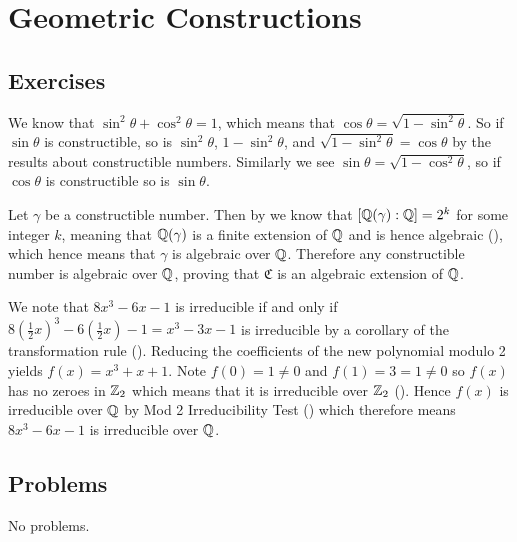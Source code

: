 \section{Geometric Constructions}
\subsection*{Exercises}
\begin{questions}
    \item We know that $\sin^2\theta + \cos^2\theta = 1$, which means that $\cos\theta = \sqrt{1-\sin^2\theta}$. So if $\sin\theta$ is constructible, so is $\sin^2\theta$, $1 - \sin^2\theta$, and $\sqrt{1-\sin^2\theta} = \cos\theta$ by the results about constructible numbers. Similarly we see $\sin\theta = \sqrt{1-\cos^2\theta}$, so if $\cos\theta$ is constructible so is $\sin\theta$.

    \item Let $\gamma$ be a constructible number. Then by  we know that $[\mathbb{Q}(\gamma):\mathbb{Q}] = 2^k$ for some integer $k$, meaning that $\mathbb{Q}(\gamma)$ is a finite extension of $\mathbb{Q}$ and is hence algebraic (), which hence means that $\gamma$ is algebraic over $\mathbb{Q}$. Therefore any constructible number is algebraic over $\mathbb{Q}$, proving that $\mathfrak{C}$ is an algebraic extension of $\mathbb{Q}$.

    \item We note that $8x^3 - 6x - 1$ is irreducible if and only if $8\left(\frac12x\right)^3 - 6\left(\frac12x\right) - 1 = x^3 - 3x - 1$ is irreducible by a corollary of the transformation rule (). Reducing the coefficients of the new polynomial modulo 2 yields $f(x) = x^3 + x + 1$. Note $f(0) = 1 \neq 0$ and $f(1) = 3 = 1 \neq 0$ so $f(x)$ has no zeroes in $\mathbb{Z}_2$ which means that it is irreducible over $\mathbb{Z}_2$ (). Hence $f(x)$ is irreducible over $\mathbb{Q}$ by Mod 2 Irreducibility Test () which therefore means $8x^3 - 6x - 1$ is irreducible over $\mathbb{Q}$.
\end{questions}

\subsection*{Problems}
No problems.
